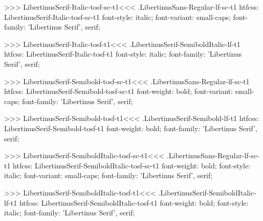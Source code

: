 {{{{>>>
\<LibertinusSerif-Italic-tosf-sc-t1\><<<
.LibertinusSans-Regular-lf-sc-t1
htfcss:  LibertinusSerif-Italic-tosf-sc-t1  font-style: italic; font-variant: small-caps; font-family: 'Libertinus Serif', serif;

>>>
\<LibertinusSerif-Italic-tosf-t1\><<<
.LibertinusSerif-SemiboldItalic-lf-t1
htfcss:  LibertinusSerif-Italic-tosf-t1  font-style: italic; font-family: 'Libertinus Serif', serif;

>>>
\<LibertinusSerif-Semibold-tosf-sc-t1\><<<
.LibertinusSans-Regular-lf-sc-t1
htfcss:  LibertinusSerif-Semibold-tosf-sc-t1  font-weight: bold; font-variant: small-caps; font-family: 'Libertinus Serif', serif;

>>>
\<LibertinusSerif-Semibold-tosf-t1\><<<
.LibertinusSerif-Semibold-lf-t1
htfcss:  LibertinusSerif-Semibold-tosf-t1  font-weight: bold; font-family: 'Libertinus Serif', serif;

>>>
\<LibertinusSerif-SemiboldItalic-tosf-sc-t1\><<<
.LibertinusSans-Regular-lf-sc-t1
htfcss:  LibertinusSerif-SemiboldItalic-tosf-sc-t1  font-weight: bold; font-style: italic; font-variant: small-caps; font-family: 'Libertinus Serif', serif;

>>>
\<LibertinusSerif-SemiboldItalic-tosf-t1\><<<
.LibertinusSerif-SemiboldItalic-lf-t1
htfcss:  LibertinusSerif-SemiboldItalic-tosf-t1  font-weight: bold; font-style: italic; font-family: 'Libertinus Serif', serif;

}}}}
